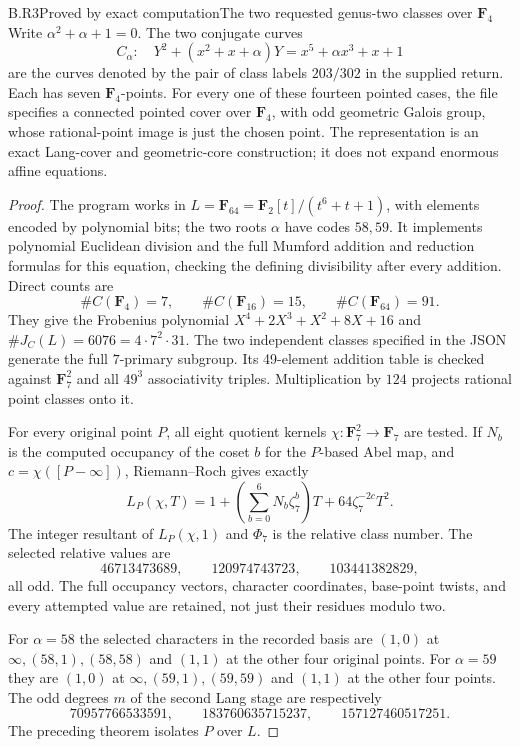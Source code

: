 \begin{claim}{B.R3}{Proved by exact computation}{The two requested genus-two classes over $\mathbf F_4$}
Write $\alpha^2+\alpha+1=0$. The two conjugate curves
\[
 C_\alpha:\quad Y^2+(x^2+x+\alpha)Y
   =x^5+\alpha x^3+x+1
\]
are the curves denoted by the pair of class labels $203/302$ in
the supplied return. Each has seven $\mathbf F_4$-points.
For every one of these fourteen pointed cases, the file
 specifies a connected
pointed cover over $\mathbf F_4$, with odd geometric Galois group,
whose rational-point image is just the chosen point.
The representation is an exact Lang-cover and geometric-core
construction; it does not expand enormous affine equations.
\end{claim}
\begin{proof}
The program  works in
$L=\mathbf F_{64}=\mathbf F_2[t]/(t^6+t+1)$, with elements encoded
by polynomial bits; the two roots $\alpha$ have codes $58,59$.
It implements polynomial Euclidean division and the full Mumford
addition and reduction formulas for this equation, checking the
defining divisibility after every addition. Direct counts are
\[
 \#C(\mathbf F_4)=7,\qquad \#C(\mathbf F_{16})=15,\qquad
 \#C(\mathbf F_{64})=91.
\]
They give the Frobenius polynomial
$X^4+2X^3+X^2+8X+16$ and
$\#J_C(L)=6076=4\cdot7^2\cdot31$. The two independent classes
specified in the JSON generate the full $7$-primary subgroup.
Its 49-element addition table is checked against
$\mathbf F_7^2$ and all $49^3$ associativity triples.
Multiplication by $124$ projects rational point classes onto it.

For every original point $P$, all eight quotient kernels
$\chi:\mathbf F_7^2\to\mathbf F_7$ are tested. If $N_b$ is the
computed occupancy of the coset $b$ for the $P$-based Abel map,
and $c=\chi([P-\infty])$, Riemann--Roch gives exactly
\[
 L_P(\chi,T)=1+\left(\sum_{b=0}^6N_b\zeta_7^b\right)T
                    +64\zeta_7^{-2c}T^2 .
\]
The integer resultant of $L_P(\chi,1)$ and
$\Phi_7$ is the relative class number. The selected relative
values are
\[
 46713473689,\qquad120974743723,\qquad103441382829,
\]
all odd. The full occupancy vectors, character coordinates,
base-point twists, and every attempted value are retained, not
just their residues modulo two.

For $\alpha=58$ the selected characters in the recorded basis are
$(1,0)$ at $\infty,(58,1),(58,58)$ and $(1,1)$ at the other four
original points. For $\alpha=59$ they are $(1,0)$ at
$\infty,(59,1),(59,59)$ and $(1,1)$ at the other four points.
The odd degrees $m$ of the second Lang stage are respectively
\[
 70957766533591,\qquad183760635715237,\qquad157127460517251.
\]
The preceding theorem isolates $P$ over $L$.


\end{proof}
